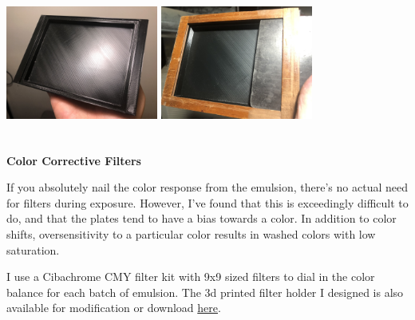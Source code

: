 \documentclass[11pt]{article}
\begin{document}
\begin{center}
\includegraphics[width=5cm, height=5cm]{img/part3_3.jpg}
\includegraphics[width=5cm, height=5cm]{img/part3_4.jpg}
\end{center}

\textbf{Color Corrective Filters}\newline

If you absolutely nail the color response from the emulsion, there's no actual need for filters during exposure. However, I've found that this is exceedingly difficult to do, and that the plates tend to have a bias towards a color. In addition to color shifts, oversensitivity to a particular color results in washed colors with low saturation.\newline

I use a Cibachrome CMY filter kit with 9x9 sized filters to dial in the color balance for each batch of emulsion. The 3d printed filter holder I designed is also available for modification or download \href{https://www.tinkercad.com/things/iRrxHK9En0b}{here}.\newline
\end{document}
